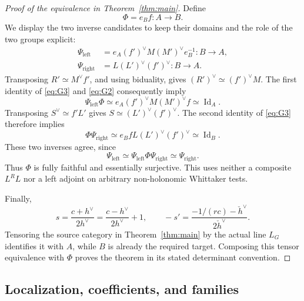 \begin{proof}[Proof of the equivalence in Theorem~\ref{thm:main}]
Define
\begin{equation}\label{eq:G4}
 \Phi=e_Bf:A\longrightarrow B.
\end{equation}
We display the two inverse candidates to keep their domains and the
role of the two groups explicit:
\[
 \begin{aligned}
 \Psi_{\mathrm{left}}
   &=e_A(f')^\vee M(M')^\vee e_B^{-1}:B\longrightarrow A,\\
 \Psi_{\mathrm{right}}
   &=L(L')^\vee(f')^\vee:B\longrightarrow A.
 \end{aligned}
\]
Transposing \(R'\simeq M^\vee f'\), and using biduality, gives
\((R')^\vee\simeq(f')^\vee M\).  The first identity of
\eqref{eq:G3} and \eqref{eq:G2} consequently imply
\[
 \Psi_{\mathrm{left}}\Phi
 \simeq e_A(f')^\vee M(M')^\vee f
 \simeq\operatorname{Id}_A.
\]
Transposing \(S^\vee\simeq f'L'\) gives
\(S\simeq(L')^\vee(f')^\vee\).  The second identity of
\eqref{eq:G3} therefore implies
\[
 \Phi\Psi_{\mathrm{right}}
 \simeq e_BfL(L')^\vee(f')^\vee
 \simeq\operatorname{Id}_B.
\]
These two inverses agree, since
\[
 \Psi_{\mathrm{left}}
 \simeq\Psi_{\mathrm{left}}\Phi\Psi_{\mathrm{right}}
 \simeq\Psi_{\mathrm{right}}.
\]
Thus \(\Phi\) is fully faithful and essentially surjective.  This uses
neither a composite \(L^RL\) nor a left adjoint on arbitrary
non-holonomic Whittaker tests.

Finally,
\[
 s=\frac{c+h^\vee}{2h^\vee}
   =\frac{c-h^\vee}{2h^\vee}+1,
 \qquad
 -s'=\frac{-1/(rc)-\check h^\vee}{2\check h^\vee}.
\]
Tensoring the source category in Theorem~\ref{thm:main} by the actual
line \(L_G\) identifies it with \(A\), while \(B\) is already the
required target.  Composing this tensor equivalence with \(\Phi\)
proves the theorem in its stated determinant convention.
\end{proof}

\subsection{Localization, coefficients, and families}

